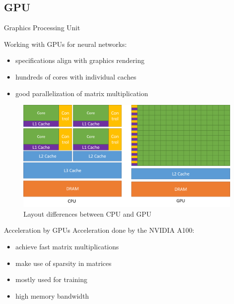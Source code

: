 \documentclass[en]{sdqbeamer}
\begin{document}
	\subsection{GPU}
	\begin{frame}{Graphics Processing Unit}
		\begin{minipage}[b]{0.45\paperwidth}
			Working with GPUs for neural networks:
			\begin{itemize}
				\item specifications align with graphics rendering
				\item hundreds of cores with individual caches
				\item good parallelization of matrix multiplication
			\end{itemize}
		\end{minipage}
		\begin{minipage}{0.45\paperwidth}
			\begin{figure}
				\includegraphics[width= 0.47\paperwidth, right]{pictures/intel_comparison.png}
				\caption{Layout differences between CPU and GPU \cite{intelpic_comparison}}
			\end{figure}
		\end{minipage}
	\end{frame}
	
	\begin{frame}{Acceleration by GPUs}
		Acceleration done by the NVIDIA A100\cite{nvidiav100}:
		\begin{itemize}
			\item achieve fast matrix multiplications
			\item make use of sparsity in matrices
			\item mostly used for training
			\item high memory bandwidth
		\end{itemize}
	\end{frame}
	
\end{document}
